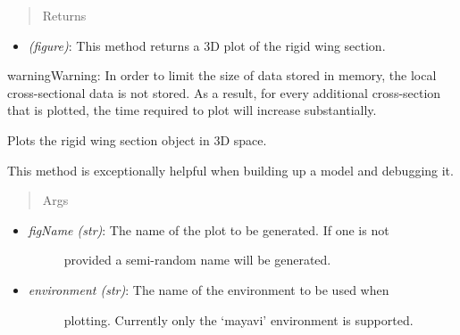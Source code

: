 \documentclass[letterpaper,10pt,english]{sphinxmanual}
\begin{document}
\begin{fulllineitems}
\begin{fulllineitems}
\begin{itemize}
\begin{description}
\end{description}

\end{itemize}
\begin{quote}\begin{description}
\item[{Returns}] \leavevmode
\end{description}\end{quote}
\begin{itemize}
\item {} 
\emph{(figure)}: This method returns a 3D plot of the rigid wing section.

\end{itemize}

\begin{notice}{warning}{Warning:}
In order to limit the size of data stored in memory, the
local cross-sectional data is not stored. As a result, for every
additional cross-section that is plotted, the time required to plot
will increase substantially.
\end{notice}

\end{fulllineitems}


\begin{fulllineitems}
\label{structures:AeroComBAT.Structures.WingSection.plotRigid}
Plots the rigid wing section object in 3D space.

This method is exceptionally helpful when building up a model and
debugging it.
\begin{quote}\begin{description}
\item[{Args}] \leavevmode
\end{description}\end{quote}
\begin{itemize}
\item {} \begin{description}
\item[{\emph{figName (str)}: The name of the plot to be generated. If one is not}] \leavevmode
provided a semi-random name will be generated.

\end{description}

\item {} \begin{description}
\item[{\emph{environment (str)}: The name of the environment to be used when}] \leavevmode
plotting. Currently only the `mayavi' environment is supported.


\end{description}
\end{itemize}
\end{fulllineitems}
\end{fulllineitems}
\end{document}
